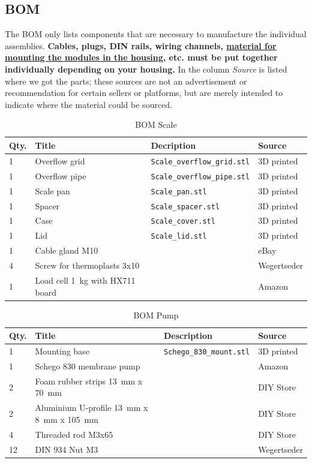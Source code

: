 \documentclass[a4paper]{scrartcl}
\begin{document}
\FloatBarrier
\subsection{BOM}
The BOM only lists components that are necessary to manufacture the individual assemblies. \textbf{Cables, plugs, DIN rails, wiring channels, \uline{material for mounting the modules in the housing}, etc. must be put together individually depending on your housing.} In the column \textit{Source} is listed where we got the parts; these sources are not an advertisement or recommendation for certain sellers or platforms, but are merely intended to indicate where the material could be sourced.

\begin{table}
\caption{BOM Scale}
\begin{tabular}{|l|l|l|l|}
\hline
Qty. & Title & Decription & Source\\
\hline\hline
1 & Overflow grid & \texttt{Scale\_overflow\_grid.stl} & 3D printed \\
\hline 
1 & Overflow pipe & \texttt{Scale\_overflow\_pipe.stl} & 3D printed\\
\hline 
1 & Scale pan & \texttt{Scale\_pan.stl} & 3D printed\\
\hline
1 & Spacer & \texttt{Scale\_spacer.stl} & 3D printed\\
\hline
1 & Case & \texttt{Scale\_cover.stl} & 3D printed \\
\hline 
1 & Lid & \texttt{Scale\_lid.stl} & 3D printed\\
\hline 
1 & Cable gland M10&  & eBay\\
\hline 
4 & Screw for thermoplasts 3x10& & Wegertseder\\
\hline
1 & Load cell \SI{1}{\kilo\gram} with HX711 board & &Amazon\\
\hline
\end{tabular}
\end{table}

\begin{table}
\caption{BOM Pump}
\begin{tabular}{|l|l|l|l|}
\hline
Qty. & Title & Description & Source\\
\hline\hline
1 & Mounting base & \texttt{Schego\_830\_mount.stl} & 3D printed \\
\hline
1 & Schego 830 membrane pump & &Amazon\\
\hline 
2 & Foam rubber strips \SI{13}{\milli\metre} x \SI{70}{\milli\metre} & & DIY Store \\
\hline
2 & Aluminium U-profile \SI{13}{\milli\metre} x \SI{8}{\milli\metre} x \SI{105}{\milli\metre} & & DIY Store\\
\hline 
4 & Threaded rod M3x65 & & DIY Store\\
\hline
12 & DIN 934 Nut M3 & & Wegertseder\\
\hline
\end{tabular}
\end{table}
\end{document}
